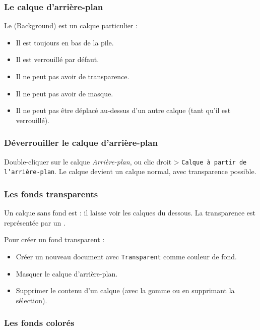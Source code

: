 \subsubsection{Le calque d'arrière-plan}

Le  (Background) est un calque particulier :

\begin{itemize}
    \item Il est toujours en bas de la pile.
    \item Il est verrouillé par défaut.
    \item Il ne peut pas avoir de transparence.
    \item Il ne peut pas avoir de masque.
    \item Il ne peut pas être déplacé au-dessus d'un autre calque (tant qu'il est verrouillé).
\end{itemize}

\subsubsection{Déverrouiller le calque d'arrière-plan}

Double-cliquer sur le calque \emph{Arrière-plan}, ou clic droit > \texttt{Calque à partir de l'arrière-plan}. Le calque devient un calque normal, avec transparence possible.

\subsubsection{Les fonds transparents}

Un calque sans fond est  : il laisse voir les calques du dessous. La transparence est représentée par un .

Pour créer un fond transparent :

\begin{itemize}
    \item Créer un nouveau document avec \texttt{Transparent} comme couleur de fond.
    \item Masquer le calque d'arrière-plan.
    \item Supprimer le contenu d'un calque (avec la gomme ou en supprimant la sélection).
\end{itemize}

\subsubsection{Les fonds colorés}

